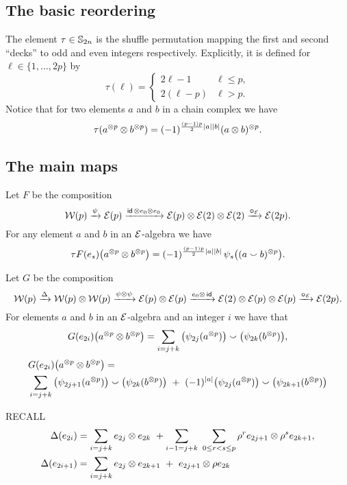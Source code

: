 \subsection{The basic reordering}

The element $\tau \in \mathbb{S}_{2n}$ is the shuffle permutation mapping the first and second ``decks'' to odd and even integers respectively.
Explicitly, it is defined for $\ell \in \{1,\dots,2p\}$ by
\begin{equation*}
	\tau(\ell) =
	\begin{cases}
		2\ell-1 & \ell \leq p, \\
		2(\ell-p) & \ell > p.
	\end{cases}
\end{equation*}
Notice that for two elements $a$ and $b$ in a chain complex we have
\[
\tau(a^{\otimes p} \otimes b^{\otimes p}) = (-1)^{\frac{(p-1)p}{2}\lvert a\rvert\lvert b\rvert} (a \otimes b)^{\otimes p}.
\]

\subsection{The main maps}

\sssec

Let $F$ be the composition
\[
\mathcal{W}(p) \xrightarrow{\psi} \mathcal{E}(p) \xrightarrow{\mathsf{id}\, \otimes e_0 \otimes e_0} \mathcal{E}(p) \otimes \mathcal{E}(2) \otimes \mathcal{E}(2) \xrightarrow{\bm{\circ}_{\mathcal{E}}} \mathcal{E}(2p).
\]
For any element $a$ and $b$ in an $\mathcal{E}$-algebra we have
\[
\tau F(e_s)\big(a^{\otimes p} \otimes b^{\otimes p}\big) =
(-1)^{\frac{(p-1)p}{2}\lvert a\rvert\lvert b\rvert} \, \psi_{s}\big((a \smallsmile b)^{\otimes p}\big).
\]

\sssec

Let $G$ be the composition
\[
\mathcal{W}(p) \xrightarrow{\Delta}
\mathcal{W}(p) \otimes \mathcal{W}(p) \xrightarrow{\psi \otimes \psi}
\mathcal{E}(p) \otimes \mathcal{E}(p) \xrightarrow{e_0 \otimes\, \mathsf{id}}
\mathcal{E}(2) \otimes \mathcal{E}(p) \otimes \mathcal{E}(p) \xrightarrow{\bm{\circ}_{\mathcal{E}}}
\mathcal{E}(2p).
\]
For elements $a$ and $b$ in an $\mathcal{E}$-algebra and an integer $i$ we have that
\begin{equation}
	G(e_{2i})\big(a^{\otimes p} \otimes b^{\otimes p}\big) =
	\sum_{i=j+k}\big(\psi_{2j}(a^{\otimes p})\big) \smallsmile \big(\psi_{2k}(b^{\otimes p})\big),
\end{equation}
\begin{equation}
	\begin{split}
		&G(e_{2i})\big(a^{\otimes p} \otimes b^{\otimes p}\big) = \\
		&\sum_{i=j+k} \big(\psi_{2j+1}(a^{\otimes p})\big) \smallsmile \big(\psi_{2k}(b^{\otimes p})\big) \ +\
		(-1)^{\lvert a\rvert}\big(\psi_{2j}(a^{\otimes p})\big) \smallsmile \big(\psi_{2k+1}(b^{\otimes p})\big)
	\end{split}
\end{equation}

RECALL
\begin{align*}
	\Delta(e_{2i}) &=
	\sum_{i=j+k} e_{2j} \otimes e_{2k} \ + \sum_{i-1=j+k} \ \sum_{0 \leq r < s \leq p} \rho^r e_{2j+1} \otimes \rho^s e_{2k+1}, \\
	\Delta(e_{2i+1}) &=
	\sum_{i=j+k} e_{2j} \otimes e_{2k+1} \ +\ e_{2j+1} \otimes \rho e_{2k}
\end{align*}
